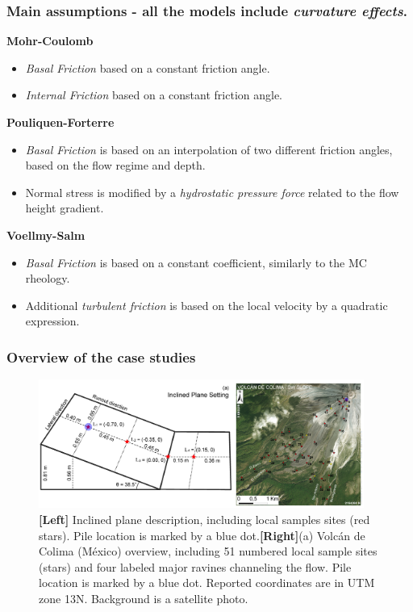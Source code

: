 \documentclass{beamer}
\begin{document}
\begin{frame}
\frametitle{Main assumptions - \small{all the models include \textit{curvature effects}}.}
\textbf{Mohr-Coulomb}
\begin{itemize}
\item \textit{Basal Friction} based on a constant friction angle.
\item \textit{Internal Friction} based on a constant friction angle.
\end{itemize}

\textbf{Pouliquen-Forterre}
\begin{itemize}
\item \textit{Basal Friction} is based on an interpolation of two different friction angles, based on the flow regime and depth.
\item Normal stress is modified by a \textit{hydrostatic pressure force} related to the flow height gradient.
\end{itemize}

\textbf{Voellmy-Salm}
\begin{itemize}
\item \textit{Basal Friction} is based on a constant coefficient, similarly to the MC rheology.
\item Additional \textit{turbulent friction} is based on the local velocity by a quadratic expression.
\end{itemize}
\end{frame}


\begin{frame}
\frametitle{Overview of the case studies}
\begin{figure}
\includegraphics[width=0.95\textwidth]{ChineseFig.jpeg}
    \caption{{\bf [Left]} Inclined plane description, including local samples sites (red stars). Pile location is marked by a blue dot.{\bf [Right]}(a) Volc{\'a}n de Colima (M{\'e}xico) overview, including 51 numbered local sample sites (stars) and four labeled major ravines channeling the flow. Pile location is marked by a blue dot. Reported coordinates are in UTM zone 13N. Background is a satellite photo. }
\end{figure}
\end{frame}
\end{document}
